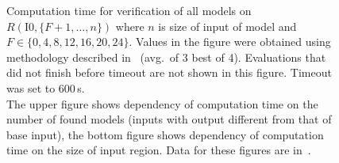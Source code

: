 \begin{figure}[p]
\begin{tikzpicture}[scale=1.2]
    \end{tikzpicture}
    \caption{Computation time for verification of all models on $R(\text{I0}, \{F+1,\ldots,n\})$
    where $n$ is size of input of model and $F \in \{0,4,8,12,16,20,24\}$.
    Values in the figure were obtained using methodology described in~
    (avg.\ of 3 best of 4). Evaluations that did not finish before timeout are not shown
    in this figure. Timeout was set to 600\,s.\\
    The upper figure shows dependency of computation time on the number of found models
    (inputs with output different from that of base input),
    the bottom figure shows dependency of computation time on the size of input region.
    Data for these figures are in~.
    }\label{fig:eval_fixed_big}%
\end{figure}
